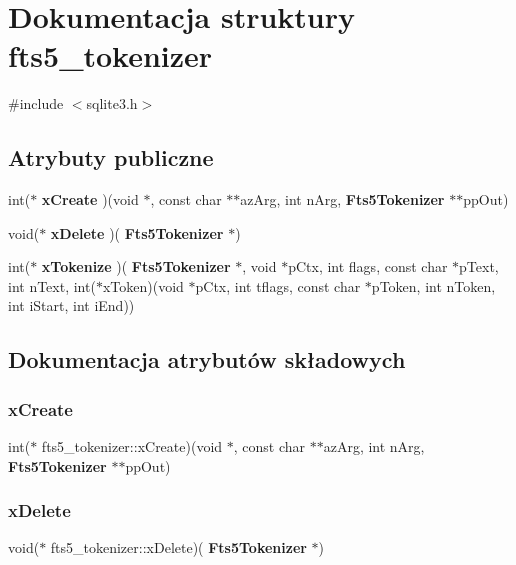 \section{Dokumentacja struktury fts5\+\_\+tokenizer}
\label{structfts5__tokenizer}


{\ttfamily \#include $<$sqlite3.\+h$>$}

\subsection*{Atrybuty publiczne}
\begin{DoxyCompactItemize}
\item 
int($\ast$ \textbf{ x\+Create} )(void $\ast$, const char $\ast$$\ast$az\+Arg, int n\+Arg, \textbf{ Fts5\+Tokenizer} $\ast$$\ast$pp\+Out)
\item 
void($\ast$ \textbf{ x\+Delete} )(\textbf{ Fts5\+Tokenizer} $\ast$)
\item 
int($\ast$ \textbf{ x\+Tokenize} )(\textbf{ Fts5\+Tokenizer} $\ast$, void $\ast$p\+Ctx, int flags, const char $\ast$p\+Text, int n\+Text, int($\ast$x\+Token)(void $\ast$p\+Ctx, int tflags, const char $\ast$p\+Token, int n\+Token, int i\+Start, int i\+End))
\end{DoxyCompactItemize}


\subsection{Dokumentacja atrybutów składowych}
\mbox{\label{structfts5__tokenizer_ab0e73328047d3191668ecad51839873d}} 
\subsubsection{xCreate}
{\footnotesize\ttfamily int($\ast$ fts5\+\_\+tokenizer\+::x\+Create)(void $\ast$, const char $\ast$$\ast$az\+Arg, int n\+Arg, \textbf{ Fts5\+Tokenizer} $\ast$$\ast$pp\+Out)}

\mbox{\label{structfts5__tokenizer_a5df6926b15f5ccbffdcdf635f2f76142}} 
\subsubsection{xDelete}
{\footnotesize\ttfamily void($\ast$ fts5\+\_\+tokenizer\+::x\+Delete)(\textbf{ Fts5\+Tokenizer} $\ast$)}


